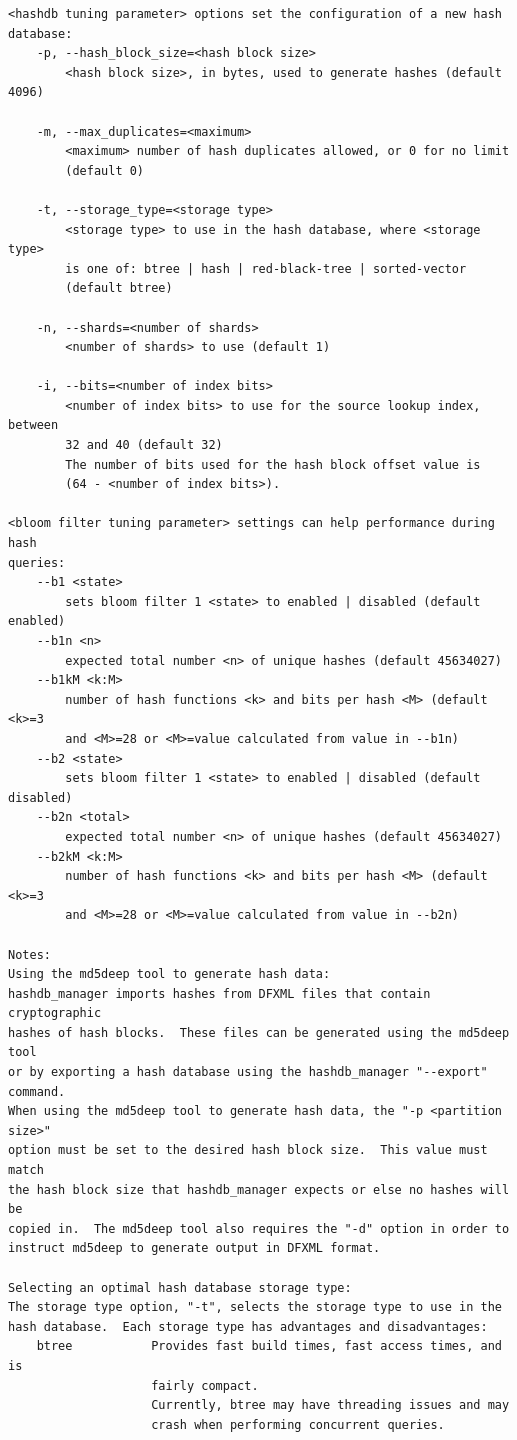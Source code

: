 \documentclass[11pt,twoside]{article}
\begin{document}
\begin{small}
\begin{verbatim}
<hashdb tuning parameter> options set the configuration of a new hash
database:
    -p, --hash_block_size=<hash block size>
        <hash block size>, in bytes, used to generate hashes (default 4096)

    -m, --max_duplicates=<maximum>
        <maximum> number of hash duplicates allowed, or 0 for no limit
        (default 0)

    -t, --storage_type=<storage type>
        <storage type> to use in the hash database, where <storage type>
        is one of: btree | hash | red-black-tree | sorted-vector
        (default btree)

    -n, --shards=<number of shards>
        <number of shards> to use (default 1)

    -i, --bits=<number of index bits>
        <number of index bits> to use for the source lookup index, between
        32 and 40 (default 32)
        The number of bits used for the hash block offset value is
        (64 - <number of index bits>).

<bloom filter tuning parameter> settings can help performance during hash
queries:
    --b1 <state>
        sets bloom filter 1 <state> to enabled | disabled (default enabled)
    --b1n <n>
        expected total number <n> of unique hashes (default 45634027)
    --b1kM <k:M>
        number of hash functions <k> and bits per hash <M> (default <k>=3
        and <M>=28 or <M>=value calculated from value in --b1n)
    --b2 <state>
        sets bloom filter 1 <state> to enabled | disabled (default disabled)
    --b2n <total>
        expected total number <n> of unique hashes (default 45634027)
    --b2kM <k:M>
        number of hash functions <k> and bits per hash <M> (default <k>=3
        and <M>=28 or <M>=value calculated from value in --b2n)

Notes:
Using the md5deep tool to generate hash data:
hashdb_manager imports hashes from DFXML files that contain cryptographic
hashes of hash blocks.  These files can be generated using the md5deep tool
or by exporting a hash database using the hashdb_manager "--export" command.
When using the md5deep tool to generate hash data, the "-p <partition size>"
option must be set to the desired hash block size.  This value must match
the hash block size that hashdb_manager expects or else no hashes will be
copied in.  The md5deep tool also requires the "-d" option in order to
instruct md5deep to generate output in DFXML format.

Selecting an optimal hash database storage type:
The storage type option, "-t", selects the storage type to use in the
hash database.  Each storage type has advantages and disadvantages:
    btree           Provides fast build times, fast access times, and is
                    fairly compact.
                    Currently, btree may have threading issues and may
                    crash when performing concurrent queries.


\end{verbatim}
\end{small}
\end{document}
